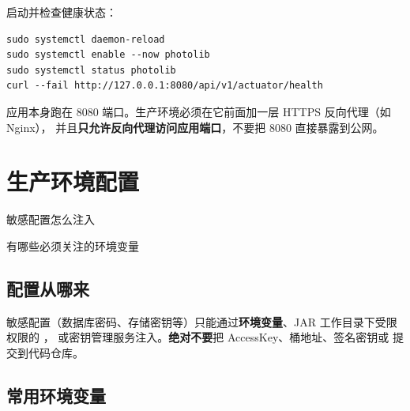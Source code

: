 \documentclass[cn,11pt,green]{elegantbook}
\begin{document}
启动并检查健康状态：

\begin{verbatim}
sudo systemctl daemon-reload
sudo systemctl enable --now photolib
sudo systemctl status photolib
curl --fail http://127.0.0.1:8080/api/v1/actuator/health
\end{verbatim}

\begin{warnbox}
  应用本身跑在 8080 端口。生产环境必须在它前面加一层 HTTPS 反向代理（如 Nginx），
  并且\textbf{只允许反向代理访问应用端口}，不要把 8080 直接暴露到公网。
\end{warnbox}

\chapter{生产环境配置}

\begin{introduction}
  \item 敏感配置怎么注入
  \item 有哪些必须关注的环境变量
\end{introduction}

\section{配置从哪来}

敏感配置（数据库密码、存储密钥等）只能通过\textbf{环境变量}、JAR 工作目录下受限权限的 ，
或密钥管理服务注入。\textbf{绝对不要}把 AccessKey、桶地址、签名密钥或  提交到代码仓库。

\section{常用环境变量}
\end{document}

